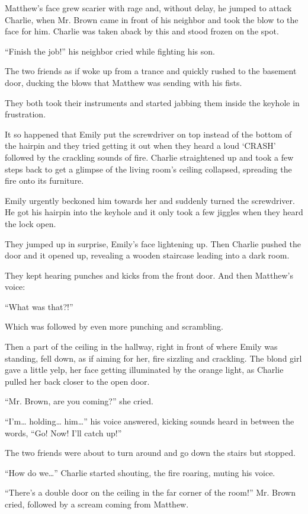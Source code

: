 Matthew’s face grew scarier with rage and, without delay, he jumped to attack Charlie, when Mr. Brown came in front of his neighbor and took the blow to the face for him. Charlie was taken aback by this and stood frozen on the spot.

“Finish the job!” his neighbor cried while fighting his son.

The two friends as if woke up from a trance and quickly rushed to the basement door, ducking the blows that Matthew was sending with his fists.

They both took their instruments and started jabbing them inside the keyhole in frustration. 

It so happened that Emily put the screwdriver on top instead of the bottom of the hairpin and they tried getting it out when they heard a loud ‘CRASH’ followed by the crackling sounds of fire. Charlie straightened up and took a few steps back to get a glimpse of the living room’s ceiling collapsed, spreading the fire onto its furniture.

Emily urgently beckoned him towards her and suddenly turned the screwdriver. He got his hairpin into the keyhole and it only took a few jiggles when they heard the lock open.

They jumped up in surprise, Emily’s face lightening up. Then Charlie pushed the door and it opened up, revealing a wooden staircase leading into a dark room.

They kept hearing punches and kicks from the front door. And then Matthew’s voice:

“What was that?!”

Which was followed by even more punching and scrambling.

Then a part of the ceiling in the hallway, right in front of where Emily was standing, fell down, as if aiming for her, fire sizzling and crackling. The blond girl gave a little yelp, her face getting illuminated by the orange light, as Charlie pulled her back closer to the open door.

“Mr. Brown, are you coming?” she cried.

“I’m… holding… him…” his voice answered, kicking sounds heard in between the words, “Go! Now! I’ll catch up!”

The two friends were about to turn around and go down the stairs but stopped.

“How do we…” Charlie started shouting, the fire roaring, muting his voice.

“There’s a double door on the ceiling in the far corner of the room!” Mr. Brown cried, followed by a scream coming from Matthew.

